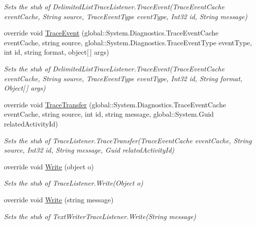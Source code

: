 \begin{DoxyCompactItemize}
\begin{DoxyCompactList}\small\item\em Sets the stub of Delimited\-List\-Trace\-Listener.\-Trace\-Event(\-Trace\-Event\-Cache event\-Cache, String source, Trace\-Event\-Type event\-Type, Int32 id, String message)\end{DoxyCompactList}\item 
override void \hyperlink{class_system_1_1_diagnostics_1_1_fakes_1_1_stub_delimited_list_trace_listener_abe1ea2d4d920a5a58095e13d7e7b44f8}{Trace\-Event} (global\-::\-System.\-Diagnostics.\-Trace\-Event\-Cache event\-Cache, string source, global\-::\-System.\-Diagnostics.\-Trace\-Event\-Type event\-Type, int id, string format, object\mbox{[}$\,$\mbox{]} args)
\begin{DoxyCompactList}\small\item\em Sets the stub of Delimited\-List\-Trace\-Listener.\-Trace\-Event(\-Trace\-Event\-Cache event\-Cache, String source, Trace\-Event\-Type event\-Type, Int32 id, String format, Object\mbox{[}$\,$\mbox{]} args)\end{DoxyCompactList}\item 
override void \hyperlink{class_system_1_1_diagnostics_1_1_fakes_1_1_stub_delimited_list_trace_listener_a35184fd000a24cba65cde05c93e7bac8}{Trace\-Transfer} (global\-::\-System.\-Diagnostics.\-Trace\-Event\-Cache event\-Cache, string source, int id, string message, global\-::\-System.\-Guid related\-Activity\-Id)
\begin{DoxyCompactList}\small\item\em Sets the stub of Trace\-Listener.\-Trace\-Transfer(\-Trace\-Event\-Cache event\-Cache, String source, Int32 id, String message, Guid related\-Activity\-Id)\end{DoxyCompactList}\item 
override void \hyperlink{class_system_1_1_diagnostics_1_1_fakes_1_1_stub_delimited_list_trace_listener_ad5d5629edadbaab176376ae7d6538494}{Write} (object o)
\begin{DoxyCompactList}\small\item\em Sets the stub of Trace\-Listener.\-Write(\-Object o)\end{DoxyCompactList}\item 
override void \hyperlink{class_system_1_1_diagnostics_1_1_fakes_1_1_stub_delimited_list_trace_listener_aab3512175493520555389cc455ba8957}{Write} (string message)
\begin{DoxyCompactList}\small\item\em Sets the stub of Text\-Writer\-Trace\-Listener.\-Write(\-String message)\end{DoxyCompactList}\item 

\end{DoxyCompactItemize}
